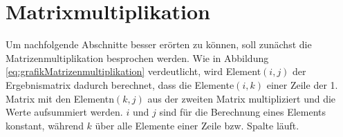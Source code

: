 \section{Matrixmultiplikation}\label{sec:Matrixmultiplikation}

% 
% 
% 
 
 


Um nachfolgende Abschnitte besser erörten zu können, soll zunächst die Matrizenmultiplikation besprochen werden.
Wie in Abbildung \ref{eq:grafikMatrizenmultiplikation} verdeutlicht, wird Element$(i,j)$ der Ergebnismatrix dadurch berechnet, dass die Elemente$(i,k)$ einer Zeile der 1. Matrix
mit den Elementn$(k,j)$ aus der zweiten Matrix multipliziert und die Werte aufsummiert werden. $i$ und $j$ sind für die Berechnung eines Elements konstant, während $k$ über alle
Elemente einer Zeile bzw. Spalte läuft.

